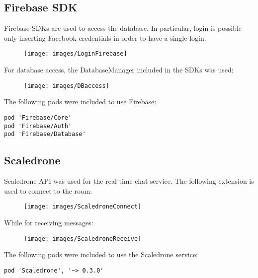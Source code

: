 \documentclass[numbers=noenddot, 12pt, a4paper, oneside]{scrbook}
\begin{document}
\subsection*{Firebase SDK}
Firebase SDKs are used to access the database. In particular, login is possible only inserting Facebook credentials in order to have a single login.

\begin{figure}[H]
	\centering
	\texttt{[image: images/LoginFirebase]}
\end{figure}
For database access, the DatabaseManager included in the SDKs was used:
\begin{figure}[H]
	\centering
	\texttt{[image: images/DBaccess]}
\end{figure}
The following pods were included to use Firebase:
\begin{lstlisting}[style=CStyle]
pod 'Firebase/Core'
pod 'Firebase/Auth'
pod 'Firebase/Database'
\end{lstlisting}

\subsection*{Scaledrone}
Scaledrone API was used for the real-time chat service. The following extension is used to connect to the room:
\begin{figure}[H]
	\centering
	\texttt{[image: images/ScaledroneConnect]}
\end{figure}
While for receiving messages:
\begin{figure}[H]
	\centering
	\texttt{[image: images/ScaledroneReceive]}
\end{figure}
The following pods were included to use the Scaledrone service:
\begin{lstlisting}[style=CStyle]
pod 'Scaledrone', '~> 0.3.0'
\end{lstlisting}
\end{document}
